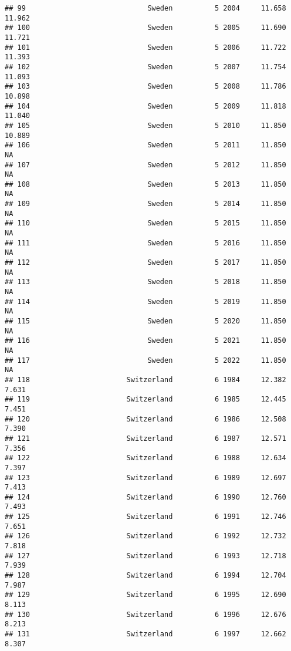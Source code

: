 \documentclass[
]{article}
\begin{document}
\begin{verbatim}
## 99                             Sweden          5 2004     11.658     11.962
## 100                            Sweden          5 2005     11.690     11.721
## 101                            Sweden          5 2006     11.722     11.393
## 102                            Sweden          5 2007     11.754     11.093
## 103                            Sweden          5 2008     11.786     10.898
## 104                            Sweden          5 2009     11.818     11.040
## 105                            Sweden          5 2010     11.850     10.889
## 106                            Sweden          5 2011     11.850         NA
## 107                            Sweden          5 2012     11.850         NA
## 108                            Sweden          5 2013     11.850         NA
## 109                            Sweden          5 2014     11.850         NA
## 110                            Sweden          5 2015     11.850         NA
## 111                            Sweden          5 2016     11.850         NA
## 112                            Sweden          5 2017     11.850         NA
## 113                            Sweden          5 2018     11.850         NA
## 114                            Sweden          5 2019     11.850         NA
## 115                            Sweden          5 2020     11.850         NA
## 116                            Sweden          5 2021     11.850         NA
## 117                            Sweden          5 2022     11.850         NA
## 118                       Switzerland          6 1984     12.382      7.631
## 119                       Switzerland          6 1985     12.445      7.451
## 120                       Switzerland          6 1986     12.508      7.390
## 121                       Switzerland          6 1987     12.571      7.356
## 122                       Switzerland          6 1988     12.634      7.397
## 123                       Switzerland          6 1989     12.697      7.413
## 124                       Switzerland          6 1990     12.760      7.493
## 125                       Switzerland          6 1991     12.746      7.651
## 126                       Switzerland          6 1992     12.732      7.818
## 127                       Switzerland          6 1993     12.718      7.939
## 128                       Switzerland          6 1994     12.704      7.987
## 129                       Switzerland          6 1995     12.690      8.113
## 130                       Switzerland          6 1996     12.676      8.213
## 131                       Switzerland          6 1997     12.662      8.307

\end{verbatim}
\end{document}
